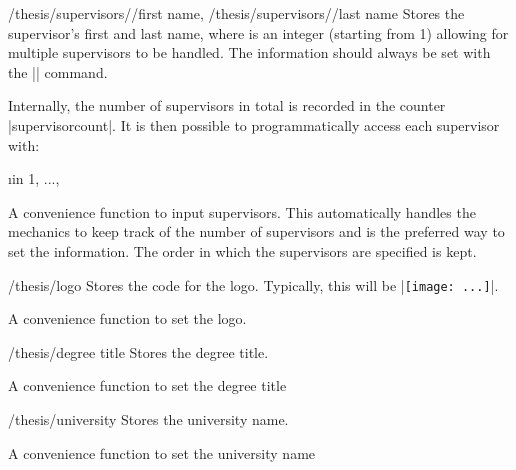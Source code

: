 \begin{keylist}{
    /thesis/supervisors//first name,
    /thesis/supervisors//last name}
  Stores the supervisor's first and last name, where  is an integer
  (starting from 1) allowing for multiple supervisors to be handled.  The
  information should always be set with the |\supervisor| command.

  Internally, the number of supervisors in total is recorded in the counter
  |supervisorcount|.  It is then possible to programmatically access each
  supervisor with:

\begin{codeexample}[]
\foreach \i in {1, ..., } {
  ~
}
\end{codeexample}

  \begin{command}{\supervisor{}}
    A convenience function to input supervisors.  This automatically handles the
    mechanics to keep track of the number of supervisors and is the preferred
    way to set the information.  The order in which the supervisors are
    specified is kept.
  \end{command}
\end{keylist}

\begin{key}{/thesis/logo}
  Stores the code for the logo.  Typically, this will be |\texttt{[image: ...]}|.

  \begin{command}{\logo{}}
    A convenience function to set the logo.
  \end{command}
\end{key}

\begin{key}{/thesis/degree title}
  Stores the degree title.

  \begin{command}{\degreetitle{}}
    A convenience function to set the degree title
  \end{command}
\end{key}

\begin{key}{/thesis/university}
  Stores the university name.

  \begin{command}{\university{}}
    A convenience function to set the university name
  \end{command}
\end{key}

